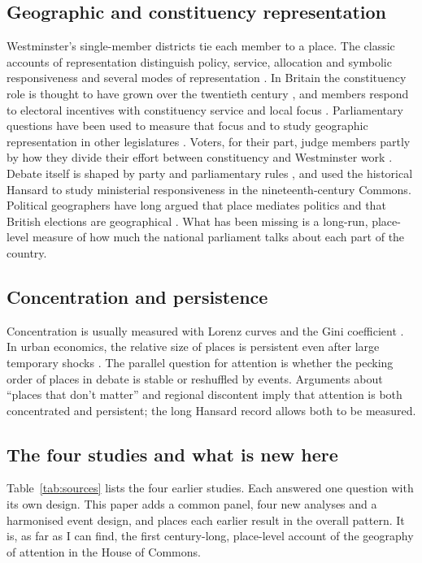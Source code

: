 \documentclass[11pt,a4paper]{article}
\begin{document}
\subsection{Geographic and constituency representation}
Westminster's single-member districts tie each member to a place. The classic accounts of representation distinguish policy, service, allocation and symbolic responsiveness \citep{eulau1977} and several modes of representation \citep{pitkin1967,mansbridge2003}. In Britain the constituency role is thought to have grown over the twentieth century \citep{norton1994,nortonwood1993,searing1994}, and members respond to electoral incentives with constituency service and local focus \citep{cain1987}. Parliamentary questions have been used to measure that focus \citep{martin2011,russo2011,kellermann2016} and to study geographic representation in other legislatures \citep{zittel2019}. Voters, for their part, judge members partly by how they divide their effort between constituency and Westminster work \citep{vivyanwagner2016}. Debate itself is shaped by party and parliamentary rules \citep{proksch2015}, and \citet{eggersspirling2014} used the historical Hansard to study ministerial responsiveness in the nineteenth-century Commons. Political geographers have long argued that place mediates politics \citep{agnew1987} and that British elections are geographical \citep{johnstonpattie2006}. What has been missing is a long-run, place-level measure of how much the national parliament talks about each part of the country.

\subsection{Concentration and persistence}
Concentration is usually measured with Lorenz curves and the Gini coefficient \citep{lorenz1905}. In urban economics, the relative size of places is persistent even after large temporary shocks \citep{davis2002}. The parallel question for attention is whether the pecking order of places in debate is stable or reshuffled by events. Arguments about ``places that don't matter'' \citep{rodriguezpose2018} and regional discontent \citep{mccann2020} imply that attention is both concentrated and persistent; the long Hansard record allows both to be measured.

\subsection{The four studies and what is new here}
Table~\ref{tab:sources} lists the four earlier studies. Each answered one question with its own design. This paper adds a common panel, four new analyses and a harmonised event design, and places each earlier result in the overall pattern. It is, as far as I can find, the first century-long, place-level account of the geography of attention in the House of Commons.
\end{document}
